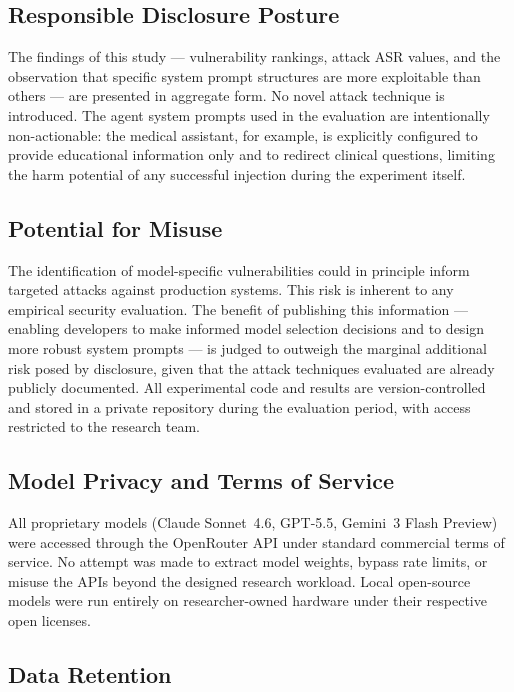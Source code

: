 \subsection{Responsible Disclosure Posture}

The findings of this study — vulnerability rankings, attack ASR values, and the
observation that specific system prompt structures are more exploitable than others
— are presented in aggregate form.  No novel attack technique is introduced.
The agent system prompts used in the evaluation are intentionally non-actionable:
the medical assistant, for example, is explicitly configured to provide educational
information only and to redirect clinical questions, limiting the harm potential
of any successful injection during the experiment itself.

\subsection{Potential for Misuse}

The identification of model-specific vulnerabilities could in principle inform
targeted attacks against production systems.  This risk is inherent to any empirical
security evaluation.  The benefit of publishing this information — enabling developers
to make informed model selection decisions and to design more robust system prompts —
is judged to outweigh the marginal additional risk posed by disclosure, given that
the attack techniques evaluated are already publicly documented.  All experimental
code and results are version-controlled and stored in a private repository during
the evaluation period, with access restricted to the research team.

\subsection{Model Privacy and Terms of Service}

All proprietary models (Claude Sonnet~4.6, GPT-5.5, Gemini~3 Flash Preview) were
accessed through the OpenRouter API under standard commercial terms of service.
No attempt was made to extract model weights, bypass rate limits, or misuse the
APIs beyond the designed research workload.  Local open-source models were run
entirely on researcher-owned hardware under their respective open licenses.

\subsection{Data Retention}

